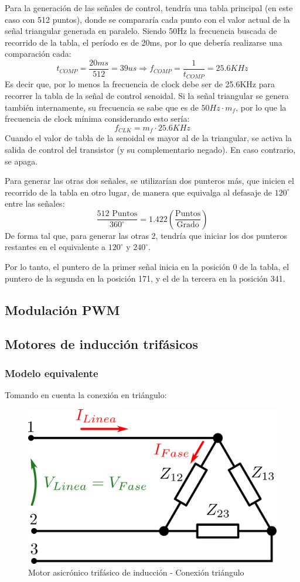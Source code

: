 \documentclass[e4_tp3_main.tex]{subfiles}
\begin{document}
Para la generación de las señales de control, tendría una tabla principal (en este caso con 512 puntos), donde se compararía cada punto con el valor actual de la señal triangular generada en paralelo. Siendo 50Hz la frecuencia buscada de recorrido de la tabla, el período es de 20ms, por lo que debería realizarse una comparación cada:
\[
t_{COMP} = \frac{20ms}{512} = 39us \Longrightarrow f_{COMP} = \frac{1}{t_{COMP}} = 25.6KHz 
\]
Es decir que, por lo menos la frecuencia de clock debe ser de 25.6KHz para recorrer la tabla de la señal de control senoidal. Si la señal triangular se genera también internamente, su frecuencia se sabe que es de $50Hz\cdot m_f$, por lo que la frecuencia de clock mínima considerando esto sería:
\[
f_{CLK} = m_f \cdot 25.6KHz
\]
Cuando el valor de tabla de la senoidal es mayor al de la triangular, se activa la salida de control del transistor (y su complementario negado). En caso contrario, se apaga.\par
Para generar las otras dos señales, se utilizarían dos punteros más, que inicien el recorrido de la tabla en otro lugar, de manera que equivalga al defasaje de $120^{\circ}$ entre las señales:
\[
\frac{512 \textrm{ Puntos}}{360^{\circ}} = 1.422 \left( \frac{\textrm{Puntos}}{\textrm{Grado}} \right)
\]
De forma tal que, para generar las otras 2, tendría que iniciar los dos punteros restantes en el equivalente a $120^{\circ}$ y $240^{\circ}$.\par
Por lo tanto, el puntero de la primer señal inicia en la posición 0 de la tabla, el puntero de la segunda en la posición 171, y el de la tercera en la posición 341. 

\newpage

\subsection{Modulación PWM}

\subsection{Motores de inducción trifásicos}

\subsubsection{Modelo equivalente}

Tomando en cuenta la conexión en triángulo:

\begin{figure}[H]
\centering
\includegraphics[width=0.6\linewidth]{Imagenes/motorParte2.png}
\caption{Motor asicrónico trifásico de inducción - Conexión triángulo}
\end{figure}
\end{document}
